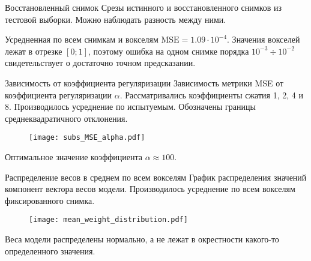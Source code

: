 \documentclass[10pt]{beamer}
\begin{document}
\begin{frame}{Восстановленный снимок}
    Срезы истинного и восстановленного снимков из тестовой выборки.
    Можно наблюдать разность между ними.
    \begin{figure}[h!]
		\centering
		\hfill
		\hfill
		\label{fig:4}
	\end{figure}
    Усредненная по всем снимкам и вокселям $\text{MSE} = 1.09 \cdot 10^{-4}$.
    Значения вокселей лежат в отрезке $[0; 1]$, поэтому ошибка на одном снимке
    порядка $10^{-3} \div 10^{-2}$ свидетельствует о достаточно точном предсказании.
\end{frame}
\begin{frame}{Зависимость от коэффициента регуляризации}
    Зависимость метрики MSE от коэффициента регуляризации $\alpha$.
    Рассматривались коэффициенты сжатия 1, 2, 4 и 8.
    Производилось усреднение по испытуемым.
	Обозначены границы среднеквадратичного отклонения.
    \begin{figure}[h!]
		\centering
		\texttt{[image: subs\_MSE\_alpha.pdf]}
		\label{fig:5}
	\end{figure}
    \vspace{-0.2cm}
    Оптимальное значение коэффициента $\alpha \approx 100$.
\end{frame}
\begin{frame}{Распределение весов в среднем по всем вокселям}
    График распределения значений компонент вектора весов модели.
    Производилось усреднение по всем вокселям фиксированного снимка.
    \begin{figure}[h!]
		\centering
		\texttt{[image: mean\_weight\_distribution.pdf]}
		\label{fig:6}
	\end{figure}
    Веса модели распределены нормально, а не лежат в окрестности какого-то определенного
    значения.
\end{frame}
\end{document}
